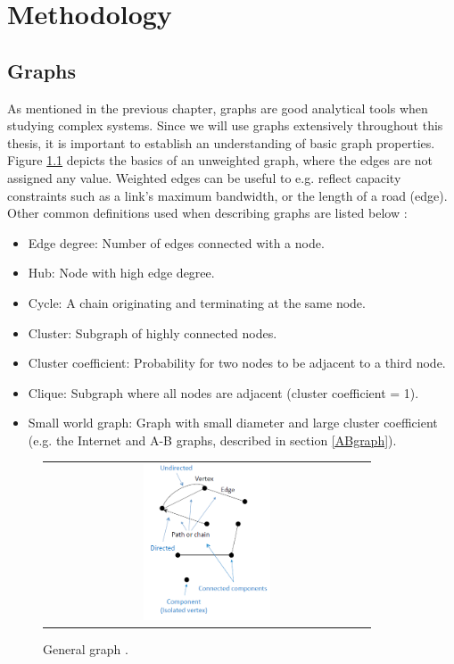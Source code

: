 \chapter{Methodology}

\section{Graphs}
As mentioned in the previous chapter, graphs are good analytical tools when studying complex systems. Since we will use graphs extensively throughout this thesis, it is important to establish an understanding of basic graph properties. Figure \ref{fig:generalGraph} depicts the basics of an unweighted graph, where the edges are not assigned any value. Weighted edges can be useful to e.g. reflect capacity constraints such as a link's maximum bandwidth, or the length of a road (edge). Other common definitions used when describing graphs are listed below \cite{audestad}:
\begin{itemize}
\item Edge degree: Number of edges connected with a node.
\item Hub: Node with high edge degree.
\item Cycle: A chain originating and terminating at the same node.
\item Cluster: Subgraph of highly connected nodes.
\item Cluster coefficient: Probability for two nodes to be adjacent to a third node.
\item Clique: Subgraph where all nodes are adjacent (cluster coefficient = 1).
\item Small world graph: Graph with small diameter and large cluster coefficient (e.g. the Internet and A-B graphs, described in section \ref{ABgraph}).
\end{itemize}

\begin{figure}[h]
\centering
\begin{tabular}{@{}c@{}}
\includegraphics[width=0.4\textwidth]{../Figures/generalGraph.png}
\end{tabular}
\caption{\label{fig:generalGraph} General graph \cite{audestad}.}
\end{figure}

